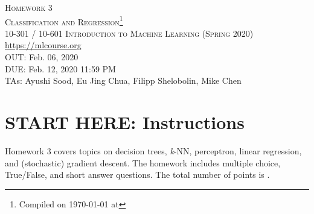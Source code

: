 \documentclass[11pt,addpoints,answers]{exam}
\title{\textsc{\hwName}} %
\author{}
\date{}
\date{}
\numberwithin{equation}{section} %
\numberwithin{figure}{section} %
\numberwithin{table}{section} %
\newcommand{\courseNum}{10-301 / 10-601}
\newcommand{\courseName}{Introduction to Machine Learning}
\newcommand{\courseSem}{Spring 2020}
\newcommand{\courseUrl}{\url{https://mlcourse.org}}
\newcommand{\hwNum}{Homework 3}
\newcommand{\hwTopic}{Classification and Regression}
\newcommand{\outDate}{Feb. 06, 2020}
\newcommand{\dueDate}{Feb. 12, 2020 11:59 PM}
\newcommand{\taNames}{Ayushi Sood, Eu Jing Chua, Filipp Shelobolin, Mike Chen}
\begin{document}
\section*{}
\begin{center}
  \textsc{\LARGE \hwNum} \\
  \textsc{\LARGE \hwTopic\footnote{Compiled on \today{} at \currenttime{}}} \\
  \vspace{1em}
  \textsc{\large \courseNum{} \courseName{} (\courseSem)} \\
  \courseUrl\\
  \vspace{1em}
  OUT: \outDate \\
  DUE: \dueDate \\
  TAs: \taNames
\end{center}

\section*{START HERE: Instructions}

\begin{notebox}
Homework 3 covers topics on decision trees, {\it k}-NN, perceptron, linear regression, and (stochastic) gradient descent. The homework includes multiple choice, True/False, and short answer questions. The total number of points is \numpoints{}.
\end{notebox}
\end{document}
